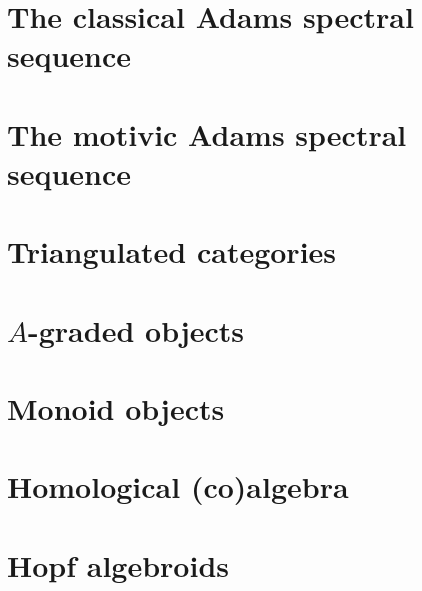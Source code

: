 \documentclass{amsart}
\theoremstyle{plain}
\theoremstyle{definition}
\newcommand{\0}{\mathbf{0}}
\renewcommand{\(}{\left(}
\renewcommand{\)}{\right)}
\newcommand{\1}{\mbf{1}}
\begin{document}


\section{The classical Adams spectral sequence}

\label{section:CASS}

\section{The motivic Adams spectral sequence}

\label{section:MASS}

\appendix

\section{Triangulated categories}\label{appendix:triangulated}



\section{\texorpdfstring{$A$}{A}-graded objects}\label{appendix:graded_stuff}



\section{Monoid objects}\label{appendix:monoid_objects}



\section{Homological (co)algebra}\label{appendix:coalgebra}



\section{Hopf algebroids}\label{appendix:hopf_algebroids}



%
%

\printbibliography
\end{document}
